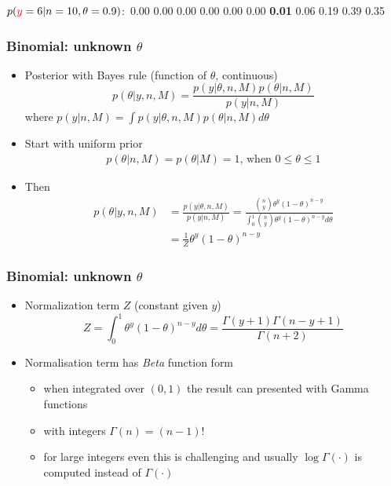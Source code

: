 \documentclass[10pt,handout]{beamer}
\begin{document}
\begin{frame}
\begin{center}
{      \vspace{-0.6\baselineskip}
{\hspace{-22mm}\scriptsize    $p({\color{red}y}=6|n=10,\theta=0.9)$:\, 0.00 0.00 0.00 0.00 0.00 0.00 \textbf{0.01} 0.06 0.19 0.39 0.35}}
\end{center}
\end{frame}

\begin{frame}
  \frametitle{Binomial: unknown $\theta$}

  \begin{itemize}
  \item Posterior with Bayes rule (function of $\theta$, continuous)
    \begin{equation*}
      p(\theta|y,n,M)=\frac{p(y|\theta,n,M)p(\theta|n,M)}{p(y|n,M)}
    \end{equation*}
    \pause
    where $p(y|n,M)=\int p(y|\theta,n,M)p(\theta|n,M) d\theta$
  \item<3-> Start with uniform prior
    \begin{align*}
      p(\theta|n,M)=p(\theta|M)=1,\, \text{when}\,\, 0\leq\theta\leq 1
    \end{align*}
  \item<4-> Then
    \begin{align*}
      p(\theta|y,n,M)&=\frac{p(y|\theta,n,M)}{p(y|n,M)}
      =\frac{\binom{n}{y} \theta^y(1-\theta)^{n-y}}{\int_0^1
        \binom{n}{y} \theta^y(1-\theta)^{n-y} d\theta} \\
        &=\frac{1}{Z}\theta^y(1-\theta)^{n-y}
    \end{align*}
  \end{itemize}

\end{frame}

\begin{frame}
  \frametitle{Binomial: unknown $\theta$}

  \begin{itemize}
  \item Normalization term $Z$ (constant given $y$)
    \begin{equation*}
      Z= \int_0^1 \theta^y(1-\theta)^{n-y} d\theta = \frac{\Gamma(y+1)\Gamma(n-y+1)}{\Gamma(n+2)}
    \end{equation*}
  \item Normalisation term has \emph{Beta} function form
    \begin{itemize}
    \item when integrated over $(0,1)$
      the result can presented with Gamma functions
    \item with integers  $\Gamma(n)=(n-1)!$
    \item for large integers even this is challenging and usually
      $\log \Gamma(\cdot)$ is computed instead of $\Gamma(\cdot)$
    \end{itemize}
  \end{itemize}

\end{frame}
\end{document}
